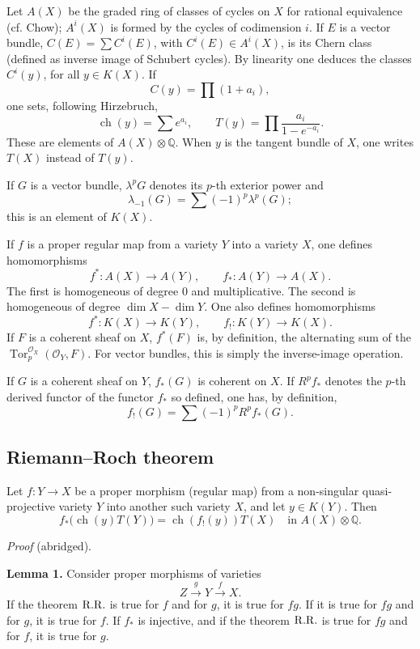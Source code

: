 \documentclass[11pt]{article}
\newcommand{\ch}{\operatorname{ch}}
\newcommand{\Tor}{\operatorname{Tor}}
\providecommand{\ch}{\operatorname{ch}}
\providecommand{\Tor}{\operatorname{Tor}}
\begin{document}
Let \(A(X)\) be the graded ring of classes of cycles on \(X\) for rational equivalence (cf. Chow); \(A^i(X)\) is formed by the cycles of codimension \(i\). If \(E\) is a vector bundle, \(C(E)=\sum C^i(E)\), with \(C^i(E)\in A^i(X)\), is its Chern class (defined as inverse image of Schubert cycles). By linearity one deduces the classes \(C^i(y)\), for all \(y\in K(X)\). If
\[
  C(y)=\prod (1+a_i),
\]
one sets, following Hirzebruch,
\[
  \ch(y)=\sum e^{a_i},\qquad
  T(y)=\prod\frac{a_i}{1-e^{-a_i}}.
\]
These are elements of \(A(X)\otimes\mathbb Q\). When \(y\) is the tangent bundle of \(X\), one writes \(T(X)\) instead of \(T(y)\).

If \(G\) is a vector bundle, \(\lambda^pG\) denotes its \(p\)-th exterior power and
\[
  \lambda_{-1}(G)=\sum(-1)^p\lambda^p(G);
\]
this is an element of \(K(X)\).

If \(f\) is a proper regular map from a variety \(Y\) into a variety \(X\), one defines homomorphisms
\[
  f^*:A(X)\longrightarrow A(Y),\qquad
  f_*:A(Y)\longrightarrow A(X).
\]
The first is homogeneous of degree \(0\) and multiplicative. The second is homogeneous of degree \(\dim X-\dim Y\). One also defines homomorphisms
\[
  f^*:K(X)\longrightarrow K(Y),\qquad
  f_!:K(Y)\longrightarrow K(X).
\]
If \(F\) is a coherent sheaf on \(X\), \(f^*(F)\) is, by definition, the alternating sum of the \(\Tor_p^{\mathcal O_X}(\mathcal O_Y,F)\). For vector bundles, this is simply the inverse-image operation.

If \(G\) is a coherent sheaf on \(Y\), \(f_*(G)\) is coherent on \(X\). If \(R^pf_*\) denotes the \(p\)-th derived functor of the functor \(f_*\) so defined, one has, by definition,
\[
  f_!(G)=\sum(-1)^p R^pf_*(G).
\]

\subsection*{Riemann--Roch theorem}
Let \(f:Y\to X\) be a proper morphism (regular map) from a non-singular quasi-projective variety \(Y\) into another such variety \(X\), and let \(y\in K(Y)\). Then
\begin{equation}\tag{1}
  f_*\bigl(\ch(y)T(Y)\bigr)=\ch(f_!(y))T(X)
  \quad\text{in } A(X)\otimes\mathbb Q.
\end{equation}

\emph{Proof} (abridged).

\textbf{Lemma 1.} Consider proper morphisms of varieties
\[
  Z \xrightarrow{g} Y \xrightarrow{f} X.
\]
If the theorem \(\mathrm{R.R.}\) is true for \(f\) and for \(g\), it is true for \(fg\). If it is true for \(fg\) and for \(g\), it is true for \(f\). If \(f_*\) is injective, and if the theorem \(\mathrm{R.R.}\) is true for \(fg\) and for \(f\), it is true for \(g\).
\end{document}
